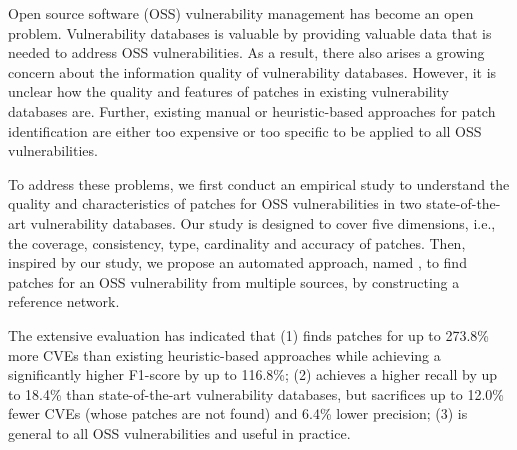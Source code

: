 \begin{abstract*}
Open source software (OSS) vulnerability management has become an open problem. Vulnerability databases is valuable by providing valuable data that is needed to address OSS vulnerabilities. As a result, there also arises a growing concern about the information quality of vulnerability databases. However, it is unclear how the quality and features of patches in existing vulnerability databases are. Further, existing manual or heuristic-based approaches for patch identification are either too expensive or too specific to be applied to all OSS vulnerabilities.

To address these problems, we first conduct an empirical study to understand the quality and characteristics of patches for OSS vulnerabilities in two state-of-the-art vulnerability databases. Our study is designed to cover five dimensions, i.e., the coverage, consistency, type, cardinality and accuracy of patches. Then, inspired by our study, we propose an automated approach, named \tool, to find patches for an OSS vulnerability from multiple sources, by constructing a reference network. %

The extensive evaluation has indicated that (1) \tool finds patches for up to 273.8\% more CVEs than existing heuristic-based approaches while achieving a significantly higher F1-score by up to 116.8\%; (2) \tool achieves a higher recall by up to 18.4\% than state-of-the-art vulnerability databases, but sacrifices up to 12.0\% fewer CVEs (whose patches are not found) and 6.4\% lower precision; (3) \tool is general to all OSS vulnerabilities and useful in practice.

\end{abstract*}